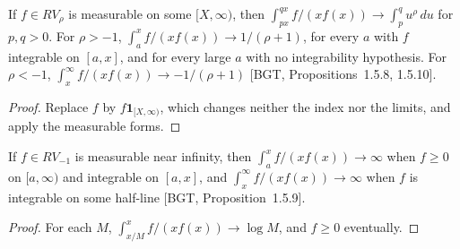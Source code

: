 \begin{theorem}
  \label{thm:karamata-near-top}
  \leanok
  If $f \in RV_\rho$ is measurable on some $[X, \infty)$, then
  $\int_{px}^{qx} f / (x f(x)) \to \int_p^q u^\rho \, du$ for $p, q > 0$. For $\rho > -1$,
  $\int_a^x f / (x f(x)) \to 1/(\rho + 1)$, for every $a$ with $f$ integrable on $[a, x]$, and for every
  large $a$ with no integrability hypothesis. For $\rho < -1$, $\int_x^\infty f / (x f(x)) \to -1/(\rho + 1)$
  [BGT, Propositions~1.5.8, 1.5.10].
\end{theorem}
\begin{proof}
  \leanok
  Replace $f$ by $f \mathbf{1}_{[X, \infty)}$, which changes neither the index nor the limits, and apply
  the measurable forms.
\end{proof}

\begin{theorem}
  \label{thm:karamata-neg-one}
  \leanok
  If $f \in RV_{-1}$ is measurable near infinity, then $\int_a^x f / (x f(x)) \to \infty$ when $f \ge 0$ on
  $[a, \infty)$ and integrable on $[a, x]$, and $\int_x^\infty f / (x f(x)) \to \infty$ when $f$ is integrable
  on some half-line [BGT, Proposition~1.5.9].
\end{theorem}
\begin{proof}
  \leanok
  For each $M$, $\int_{x/M}^{x} f / (x f(x)) \to \log M$, and $f \ge 0$ eventually.
\end{proof}

